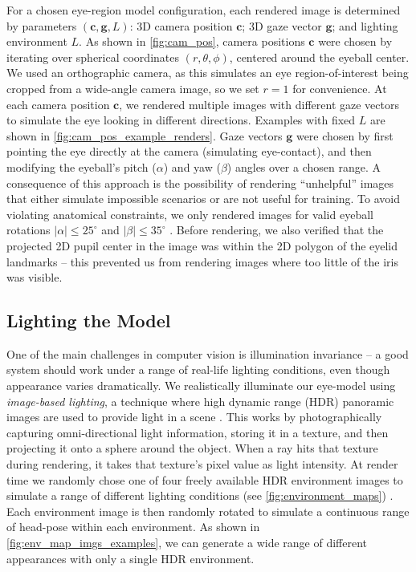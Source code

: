For a chosen eye-region model configuration, each rendered image is determined by parameters $(\mathbf{c}, \mathbf{g}, L)$: 3D camera position $\mathbf{c}$; 3D gaze vector $\mathbf{g}$; and lighting environment $L$.
As shown in \autoref{fig:cam_pos}, camera positions $\mathbf{c}$ were chosen by iterating over spherical coordinates $(r, \theta, \phi)$, centered around the eyeball center.
We used an orthographic camera, as this simulates an eye region-of-interest being cropped from a wide-angle camera image, so we set $r\!=\!1$ for convenience.
At each camera position $\mathbf{c}$, we rendered multiple images with different gaze vectors to simulate the eye looking in different directions.
Examples with fixed $L$ are shown in \autoref{fig:cam_pos_example_renders}.
Gaze vectors $\mathbf{g}$ were chosen by first pointing the eye directly at the camera (simulating eye-contact), and then modifying the eyeball's pitch ($\alpha$) and yaw ($\beta$) angles over a chosen range.
%
A consequence of this approach is the possibility of rendering ``unhelpful'' images that either simulate impossible scenarios or are not useful for training.
To avoid violating anatomical constraints, we only rendered images for valid eyeball rotations $|\alpha|\!\leq\!25^{\circ}$ and $|\beta|\!\leq\!35^{\circ}$ \cite{MIL-STD-1472G}.
Before rendering, we also verified that the projected 2D pupil center in the image was within the 2D polygon of the eyelid landmarks -- this prevented us from rendering images where too little of the iris was visible.

\subsection{Lighting the Model}

One of the main challenges in computer vision is illumination invariance -- a good system should work under a range of real-life lighting conditions, even though appearance varies dramatically.
We realistically illuminate our eye-model using \emph{image-based lighting}, a technique where high dynamic range (HDR) panoramic images are used to provide light in a scene \cite{debevec2002image}.
This works by photographically capturing omni-directional light information, storing it in a texture, and then projecting it onto a sphere around the object.
When a ray hits that texture during rendering, it takes that texture's pixel value as light intensity.
At render time we randomly chose one of four freely available HDR environment images to simulate a range of different lighting conditions (see \autoref{fig:environment_maps}) \cite{AdaptiveSamplesHDR}.
Each environment image is then randomly rotated to simulate a continuous range of head-pose within each environment. As shown in \autoref{fig:env_map_imgs_examples}, we can generate a wide range of different appearances with only a single HDR environment.

